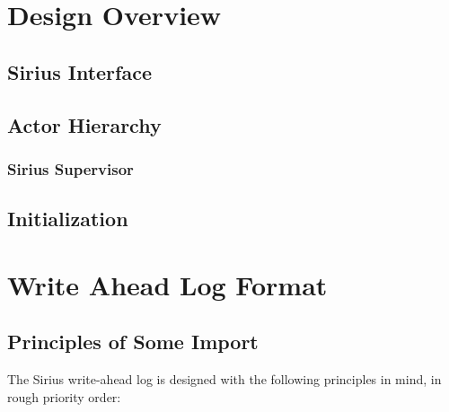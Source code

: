 \documentclass[11pt]{article}
\begin{document}
\section{Design Overview}
\subsection{Sirius Interface}

\subsection{Actor Hierarchy}

\subsubsection{Sirius Supervisor}

\subsection{Initialization}

\section{Write Ahead Log Format}

\subsection{Principles of Some Import}
The Sirius write-ahead log is designed with the following principles in mind, in rough priority order:
\end{document}
